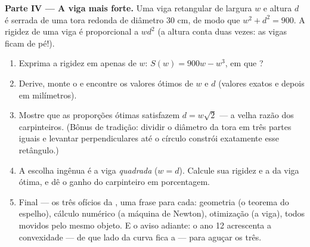 \begin{problem}
\medskip
\noindent\textbf{Parte IV --- A viga mais forte.}
Uma viga retangular de largura $w$ e altura $d$ é serrada de uma
tora redonda de diâmetro $30$ cm, de modo que $w^2 + d^2 = 900$. A
rigidez de uma viga é proporcional a $w d^2$ (a altura conta duas
vezes: as vigas ficam de pé!).
\begin{enumerate}[resume]
  \item Exprima a rigidez em  apenas de $w$:
        $S(w) = 900w - w^3$, em que ?
  \item Derive, monte o  e encontre os valores
        ótimos de $w$ e $d$ (valores exatos e depois em
        milímetros).
  \item Mostre que as proporções ótimas satisfazem
        $d = w\sqrt2$ --- a velha razão dos carpinteiros. (Bônus
        de tradição: dividir o diâmetro da tora em três partes
        iguais e levantar perpendiculares até o círculo constrói
        exatamente esse retângulo.)
  \item A escolha ingênua é a viga \emph{quadrada} ($w = d$).
        Calcule sua rigidez e a da viga ótima, e dê o ganho do
        carpinteiro em porcentagem.
  \item Final --- os três ofícios da , uma frase para
        cada: geometria (o teorema do espelho), cálculo numérico
        (a máquina de Newton), otimização (a viga), todos movidos
        pelo mesmo objeto. E o aviso adiante: o ano 12 acrescenta
        a convexidade --- de que lado da curva fica a 
        --- para aguçar os três.
\end{enumerate}
\end{problem}
